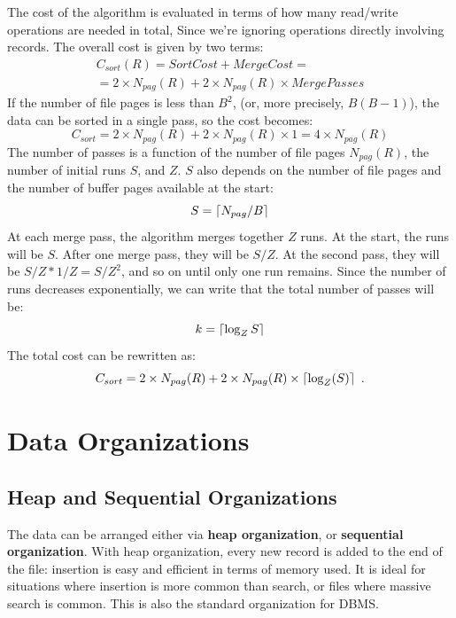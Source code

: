 The cost of the algorithm is evaluated in terms of how many read/write operations are needed in total, Since we're ignoring operations directly involving records. The overall cost is given by two terms:
\begin{align*}
    C_{sort}(R) = SortCost + MergeCost = \\
    = 2 \times N_{pag}(R) + 2 \times N_{pag}(R) \times MergePasses
\end{align*}
If the number of file pages is less than $B^2$, (or, more precisely, $B(B-1)$), the data can be sorted in a single pass, so the cost becomes:
\begin{equation*}
    C_{sort} = 2 \times N_{pag}(R) + 2 \times N_{pag}(R) \times 1 = 4 \times N_{pag}(R)
\end{equation*}
The number of passes is a function of the number of file pages $N_{pag}(R)$, the number of initial runs $S$, and $Z$. $S$ also depends on the number of file pages and the number of buffer pages available at the start:
\begin{equation*}
    S = \left\lceil N_{pag}/B\right\rceil
\end{equation*}
At each merge pass, the algorithm merges together $Z$ runs. At the start, the runs will be $S$. After one merge pass, they will be $S/Z$. At the second pass, they will be $S/Z * 1/Z = S/Z^2$, and so on until only one run remains. Since the number of runs decreases exponentially, we can write that the total number of passes will be:
\begin{equation*}
    k = \left\lceil\log_Z{S}\right\rceil
\end{equation*}
The total cost can be rewritten as:
\begin{equation*}
    C_{sort} = 2 \times N_{pag}(R) + 2 \times N_{pag}(R) \times \ceil{\log_Z(S)} \ .
\end{equation*}

\section{Data Organizations}

\subsection{Heap and Sequential Organizations}

The data can be arranged either via \textbf{heap organization}, or \textbf{sequential organization}. With heap organization, every new record is added to the end of the file: insertion is easy and efficient in terms of memory used. It is ideal for situations where insertion is more common than search, or files where massive search is common. This is also the standard organization for DBMS.

